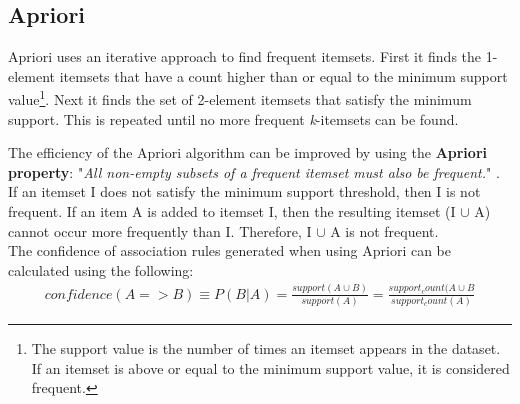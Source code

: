 \subsection{Apriori}
\label{Algo_AP}
Apriori uses an iterative approach to find frequent itemsets. First it finds the 1-element itemsets that have a count higher than or equal to the minimum support value\footnote{The support value is the number of times an itemset appears in the dataset. If an itemset is above or equal to the minimum support value, it is considered frequent.}. Next it finds the set of 2-element itemsets that satisfy the minimum support. This is repeated until no more frequent \textit{k}-itemsets can be found.

The efficiency of the Apriori algorithm can be improved by using the \textbf{Apriori property}: "\textit{All non-empty subsets of a frequent itemset must also be frequent.}" \cite[p. 249]{DataMining}. If an itemset I does not satisfy the minimum support threshold, then I is not frequent. If an item A is added to itemset I, then the resulting itemset (I $\cup$ A) cannot occur more frequently than I. Therefore, I $\cup$ A is not frequent.
\\The confidence of association rules generated when using Apriori can be calculated using the following\cite[p. ~246]{DataMining}:
\begin{align*}
confidence(A=>B) \equiv P(B|A) = \frac{support (A \cup B)}{support(A)} = \frac{support_count(A \cup B}{support_count(A)}
\end{align*}